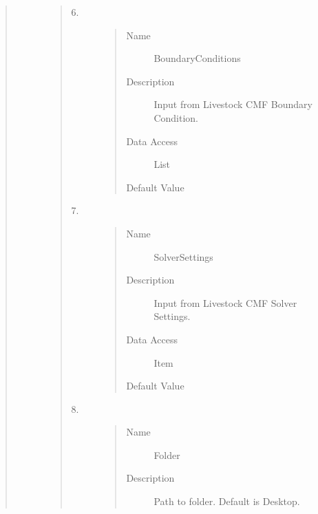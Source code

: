 \documentclass[letterpaper,10pt,english]{sphinxmanual}
\begin{document}
\begin{quote}
\begin{description}
\begin{quote}
\begin{description}
\begin{quote}
\begin{description}
\end{description}\end{quote}

\item[{6.}] \leavevmode\begin{quote}\begin{description}
\item[{Name}] \leavevmode
BoundaryConditions

\item[{Description}] \leavevmode
Input from Livestock CMF Boundary Condition.

\item[{Data Access}] \leavevmode
List

\item[{Default Value}] \leavevmode
{}

\end{description}\end{quote}

\item[{7.}] \leavevmode\begin{quote}\begin{description}
\item[{Name}] \leavevmode
SolverSettings

\item[{Description}] \leavevmode
Input from Livestock CMF Solver Settings.

\item[{Data Access}] \leavevmode
Item

\item[{Default Value}] \leavevmode
{}

\end{description}\end{quote}

\item[{8.}] \leavevmode\begin{quote}\begin{description}
\item[{Name}] \leavevmode
Folder

\item[{Description}] \leavevmode
Path to folder. Default is Desktop.


\end{description}
\end{quote}
\end{description}
\end{quote}
\end{description}
\end{quote}
\end{document}

